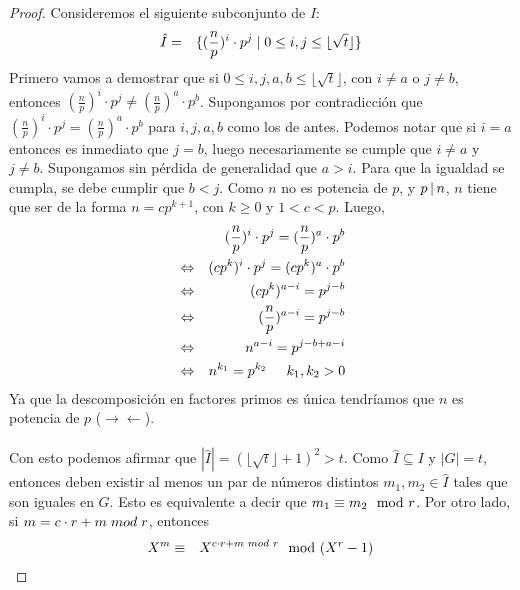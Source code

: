 	\begin{proof}
		Consideremos el siguiente subconjunto de $I$:
		\begin{eqnarray}
			\hat{I} &=&\{(\frac{n}{p})^{i}\cdot p^{j}\mid 0\leq i,j\leq \lfloor \sqrt{t}\rfloor\}\nonumber 
		\end{eqnarray}
		Primero vamos a demostrar que si $0\leq i,j,a,b\leq \lfloor \sqrt{t}\rfloor$, con $i\neq a$ o $j\neq b$, entonces $(\frac{n}{p})^{i}\cdot p^{j} \neq (\frac{n}{p})^{a}\cdot p^{b}$. Supongamos por contradicción que $(\frac{n}{p})^{i}\cdot p^{j} = (\frac{n}{p})^{a}\cdot p^{b}$ para $i,j,a,b$ como los de antes. Podemos notar que si $i=a$ entonces es inmediato que $j=b$, luego necesariamente se cumple que $i\neq a$ y $j\neq b$. Supongamos sin pérdida de generalidad que $a>i$. Para que la igualdad se cumpla, se debe cumplir que $b<j$. Como $n$ no es potencia de $p$, y $p\hspace{1.8pt}|\hspace{1.8pt}  n$, $n$ tiene que ser de la forma $n=cp^{k+1}$, con $k\geq 0$ y $1<c<p$. Luego,
		\begin{eqnarray}
			& &(\frac{n}{p})^{i}\cdot p^{j} = (\frac{n}{p})^{a}\cdot p^{b}\nonumber\\
			&\Leftrightarrow &(cp^k)^{i}\cdot p^{j} = (cp^k)^{a}\cdot p^{b}\nonumber\\
			&\Leftrightarrow &(cp^k)^{a-i} = p^{j-b}\nonumber\\
			&\Leftrightarrow &(\frac{n}{p})^{a-i} = p^{j-b}\nonumber\\
			&\Leftrightarrow &n^{a-i} = p^{j-b+a-i}\nonumber\\
			&\Leftrightarrow &n^{k_1} = p^{k_2}\hspace{0.5cm}k_1,k_2>0\nonumber
		\end{eqnarray}
		Ya que la descomposición en factores primos es única tendrí­amos que $n$ es potencia de $p$ ($\rightarrow\leftarrow$).\\\\
		Con esto podemos afirmar que $|\hat{I}|=(\lfloor \sqrt{t}\rfloor+1)^2>t$. Como $\hat{I}\subseteq I$ y $|G|=t$, entonces deben existir al menos un par de números distintos $m_1,m_2\in \hat{I}$ tales que son iguales en $G$. Esto es equivalente a decir que $m_1\equiv m_2 \mod r$. Por otro lado, si $m=c\cdot r + m\hspace{0.1cm}mod\hspace{0.1cm} r$, entonces 
		\begin{eqnarray}
			X^m &\equiv &	X^{c\cdot r + m\hspace{0.1cm}mod\hspace{0.1cm} r} \modulox\nonumber\\

\end{eqnarray}
\end{proof}
